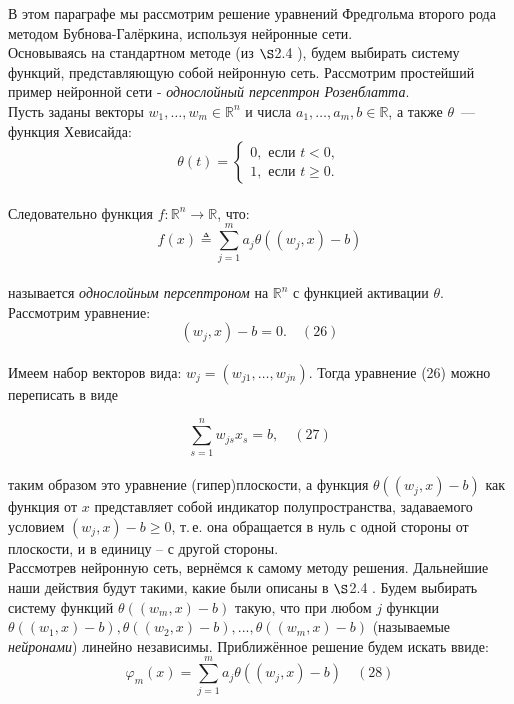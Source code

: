 \documentclass[12pt]{article}
\begin{document}
В этом параграфе мы рассмотрим решение уравнений Фредгольма второго рода методом Бубнова-Галёркина, используя нейронные сети.\\

Основываясь на стандартном методе (из $ \S $2.4 ), будем выбирать систему функций, представляющую собой нейронную сеть. Рассмотрим простейший пример нейронной сети - \textit{однослойный персептрон Розенблатта}.\\

Пусть заданы векторы  $w_1,\ldots,w_m\in\mathbb{R}^n$ и числа $a_1,\ldots,a_m,b\in\mathbb{R}$, а также $\theta$~--- функция Хевисайда:\\
$$ \theta(t)=
\begin{cases} 0,\textrm{ если } t<0,\\
1,\textrm{ если } t\geqslant 0.
\end{cases}$$\\

Следовательно функция $ f: \mathbb{R}^n \rightarrow \mathbb{R} $, что:\\
$$ \label{SingleLayerPerceptronOnHilbertSpaceWithHevesideActivationFunction} 
f\left( x\right) \triangleq 
\underset{j=1}{\stackrel{m}{\sum }}a_j \theta(
( w_j,x) -b) $$\\
называется \textit{однослойным персептроном} на $\mathbb{R}^n$ с функцией активации $\theta$. Рассмотрим уравнение:\\
$$ \label{HyperPlaneEquationInBriefForm} 
( w_j,x) -b=0. \quad (26) $$\\

Имеем набор векторов вида: $w_j=(w_{j1},\ldots,w_{jn})$. Тогда уравнение (26) можно переписать в виде

$$\label{HyperPlaneEquationInCoordinateForm}  
\sum\limits_{s=1}^n w_{js} x_s =b, \quad (27)
$$\\
таким образом это уравнение (гипер)плоскости, а функция $\theta(( w_j,x) -b)$ как функция от $x$ представляет собой индикатор полупространства, задаваемого условием $( w_j,x) -b\geqslant 0$, т.\,е. она обращается в нуль с одной стороны от плоскости, и в единицу -- с другой стороны.\\

Рассмотрев нейронную сеть, вернёмся к самому методу решения. Дальнейшие наши действия будут такими, какие были описаны в $ \S $2.4 . Будем выбирать систему функций  $ \theta(
( w_m,x) -b) $ такую, что при любом $ j $ функции $ \theta(
( w_1,x) -b), \theta(( w_2,x) -b), ..., \theta(( w_m,x) -b) $ (называемые \textit{нейронами}) линейно независимы. Приближённое решение будем искать ввиде:\\
$$\label{HyperPlaneEquationInCoordinateForm}  
 \varphi_m(x) = \underset{j=1}{\stackrel{m}{\sum }}a_j 
 \theta(( w_j,x) -b) \quad (28) $$\\
\end{document}
